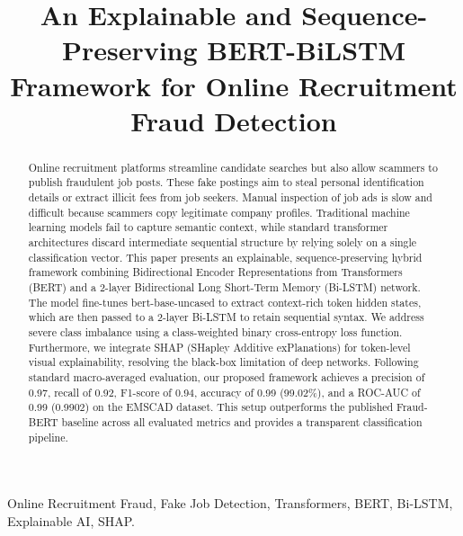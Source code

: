 \documentclass[conference]{IEEEtran}
\begin{document}
\title{An Explainable and Sequence-Preserving BERT-BiLSTM Framework for Online Recruitment Fraud Detection}

\author{
}

\maketitle

\begin{abstract}
Online recruitment platforms streamline candidate searches but also allow scammers to publish fraudulent job posts. These fake postings aim to steal personal identification details or extract illicit fees from job seekers. Manual inspection of job ads is slow and difficult because scammers copy legitimate company profiles. Traditional machine learning models fail to capture semantic context, while standard transformer architectures discard intermediate sequential structure by relying solely on a single classification vector. This paper presents an explainable, sequence-preserving hybrid framework combining Bidirectional Encoder Representations from Transformers (BERT) and a 2-layer Bidirectional Long Short-Term Memory (Bi-LSTM) network. The model fine-tunes bert-base-uncased to extract context-rich token hidden states, which are then passed to a 2-layer Bi-LSTM to retain sequential syntax. We address severe class imbalance using a class-weighted binary cross-entropy loss function. Furthermore, we integrate SHAP (SHapley Additive exPlanations) for token-level visual explainability, resolving the black-box limitation of deep networks. Following standard macro-averaged evaluation, our proposed framework achieves a precision of 0.97, recall of 0.92, F1-score of 0.94, accuracy of 0.99 (99.02\%), and a ROC-AUC of 0.99 (0.9902) on the EMSCAD dataset. This setup outperforms the published Fraud-BERT baseline across all evaluated metrics and provides a transparent classification pipeline.
\end{abstract}

\begin{IEEEkeywords}
Online Recruitment Fraud, Fake Job Detection, Transformers, BERT, Bi-LSTM, Explainable AI, SHAP.
\end{IEEEkeywords}
\end{document}
